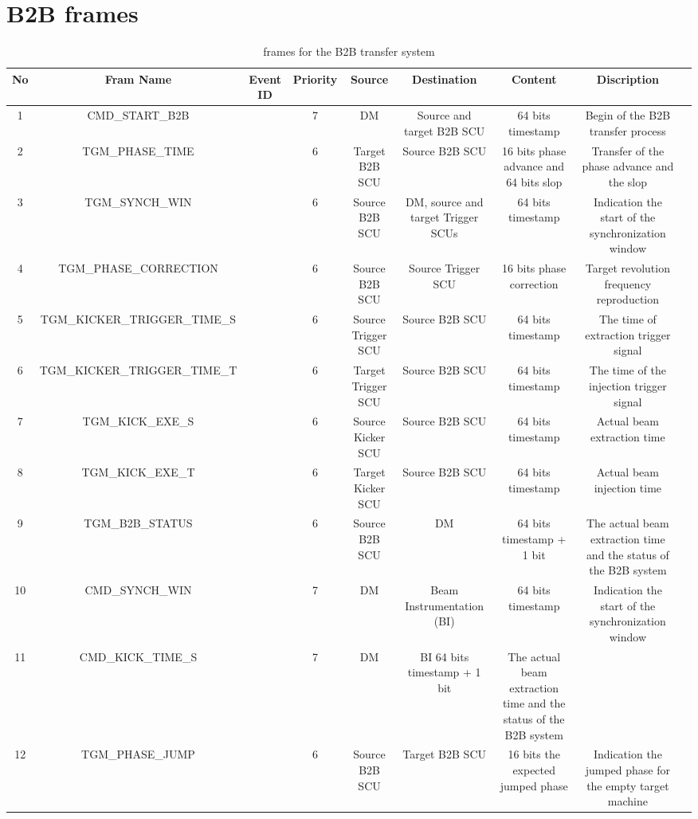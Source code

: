 \section{B2B frames}
\begin{table}[!htb]
\newcommand{\tabincell}[2]{\begin{tabular}{@{}#1@{}}#2\end{tabular}}
\caption{frames for the B2B transfer system}
\label{requirement}
\begin{center}
    \begin{tabular}{ | c | c | c | c | c | c | c | c | c |}
    \hline
     	No & Fram Name & Event ID & Priority & Source & Destination & Content & Discription \\ \hline
1&	CMD\_START\_B2B&	&7&	DM&	Source and target B2B SCU&	64 bits timestamp &Begin of the B2B transfer process\\ \hline
2&	TGM\_PHASE\_TIME&	&6&	Target B2B SCU&	Source B2B SCU&	16 bits phase advance and 64 bits slop&	Transfer of the phase advance and the slop \\ \hline
3&	TGM\_SYNCH\_WIN&	&6	&Source B2B SCU&DM, source and target Trigger SCUs	&64 bits timestamp	&Indication the start of the synchronization window\\ \hline
4&	TGM\_PHASE\_CORRECTION&&6&	Source B2B SCU&	Source Trigger SCU	&16 bits phase correction&	Target revolution frequency reproduction\\ \hline
5&	TGM\_KICKER\_TRIGGER\_TIME\_S&&6&Source Trigger SCU	&Source B2B SCU&	64 bits timestamp&	The time of extraction trigger signal\\ \hline
6&	TGM\_KICKER\_TRIGGER\_TIME\_T&	&6&	Target Trigger SCU&	Source B2B SCU&	64 bits timestamp&	The time of the injection trigger signal\\ \hline
7&	TGM\_KICK\_EXE\_S&	&			6&Source Kicker SCU&Source B2B SCU&	64 bits timestamp& 	Actual beam extraction time \\ \hline
8&	TGM\_KICK\_EXE\_T&	&			6&	Target Kicker SCU&	Source B2B SCU	&64 bits timestamp	&Actual beam injection time \\ \hline
9&	TGM\_B2B\_STATUS&&6	&Source B2B SCU&	DM	&64 bits timestamp + 1 bit&	The actual beam extraction time and the status of the B2B system  \\ \hline
10&	CMD\_SYNCH\_WIN&	&7&	DM&	Beam Instrumentation (BI)&64 bits timestamp&	Indication the start of the synchronization window\\ \hline
11&	CMD\_KICK\_TIME\_S&	&7	&	DM	&BI	64 bits timestamp + 1 bit	&	The actual beam extraction time and  the status of the B2B system \\ \hline
12	&	TGM\_PHASE\_JUMP&&6&Source B2B SCU&Target B2B SCU&16 bits the expected jumped phase&	Indication the jumped phase for the empty target machine\\ \hline

    \end{tabular}
\end{center}
\end{table}